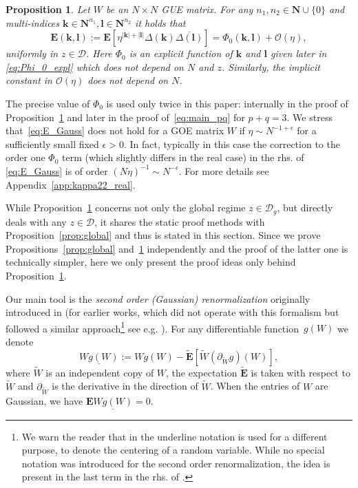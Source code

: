 \documentclass[10pt]{amsart}
\newtheorem{proposition}[theorem]{Proposition}
\numberwithin{equation}{section}
\newcommand{\E}{\mathbf{E}}
\newcommand{\N}{\mathbf{N}}
\begin{document}
\begin{proposition}\label{prop:E_Gauss} Let $W$ be an $N\times N$ GUE matrix. For any $n_1,n_2\in\N\cup\{0\}$ and multi-indices $\bm{k}\in\N^{n_1},\bm{l}\in\N^{n_2}$ it holds that    
\begin{equation}
\E(\bm{k},\bm{l}):=\E \left[\eta^{|\bm{k}|+|\bm{l}|}\Delta(\bm{k}) \overline{\Delta(\bm{l})}\right] = \Phi_0(\bm{k},\bm{l}) + \mathcal{O}(\eta),
\label{eq:E_Gauss}
\end{equation}
uniformly in $z\in \mathcal{D}$. Here $\Phi_0$ is an explicit function of $\bm{k}$ and $\bm{l}$ given later in \eqref{eq:Phi_0_expl} which does not depend on $N$ and $z$. Similarly, the implicit constant in $\mathcal{O}(\eta)$ does not depend on $N$.
\end{proposition}

The precise value of $\Phi_0$ is used only twice in this paper: internally in the proof of Proposition~\ref{prop:E_Gauss} and later in the proof of~\eqref{eq:main_pq} for $p+q=3$. We stress that~\eqref{eq:E_Gauss} does not hold for a GOE matrix $W$ if $\eta\sim N^{-1+\epsilon}$ for a sufficiently small fixed $\epsilon>0$. In fact, typically in this case the correction to the order one $\Phi_0$ term (which slightly differs in the real case) in the rhs. of \eqref{eq:E_Gauss}  is of order $(N\eta)^{-1}\sim N^{-\epsilon}$. For more details see Appendix~\ref{app:kappa22_real}.


While Proposition~\ref{prop:E_Gauss} concerns not only the global regime $z\in\mathcal{D}_g$, but directly deals with any $z\in\mathcal{D}$, it shares the static proof methods with Proposition~\ref{prop:global} and thus is stated in this section. Since we prove Propositions~\ref{prop:global} and~\ref{prop:E_Gauss} independently and the proof of the latter one is technically simpler, here we only present the proof ideas only behind Proposition~\ref{prop:E_Gauss}. 

Our main tool is the \emph{second order (Gaussian) renormalization} originally introduced in \cite[Eq.(4.2)]{ETH_Wigner} (for earlier works, which did not operate with this formalism but followed a similar approach\footnote{We warn the reader that in \cite{Knowles20} the underline notation is used for a different purpose, to denote the centering of a random variable. While no special notation was introduced for  the second order renormalization, the idea
is present in the last term in the rhs. of \cite[Eq.(2.5)]{Knowles20}.} see e.g. \cite[Eq.(2.5)]{Knowles20}). For any differentiable function~$g(W)$ we denote
\begin{equation}
\underline{Wg(W)}:=Wg(W) - \widetilde{\E}\left[ \widetilde{W}\left(\partial_{\widetilde{W}}g\right)(W)\right],
\label{eq:def_under_1}
\end{equation} 
where $\widetilde{W}$ is an independent copy of $W$, the expectation $\widetilde{\E}$ is taken with respect to $\widetilde{W}$ and $\partial_{\widetilde{W}}$ is the derivative in the direction of $\widetilde{W}$. When the entries of $W$ are Gaussian, we have $\E \underline{Wg(W)}=0$.
\end{document}
